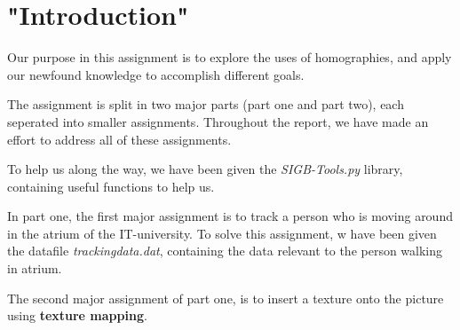 \section{"Introduction"}
Our purpose in this assignment is to explore the uses of homographies, and apply our newfound knowledge to accomplish different goals.\newline

The assignment is split in two major parts (part one and part two), each seperated into smaller assignments. Throughout the report, we have made an effort to address all of these assignments.\newline

To help us along the way, we have been given the \textsl{SIGB-Tools.py} library, containing useful functions to help us.\newline

In part one, the first major assignment is to track a person who is moving around in the atrium of the IT-university. To solve this assignment, w have been given the datafile \textsl{trackingdata.dat}, containing the data relevant to the person walking in atrium.\newline

The second major assignment of part one, is to insert a texture onto the picture using \textbf{texture mapping}.